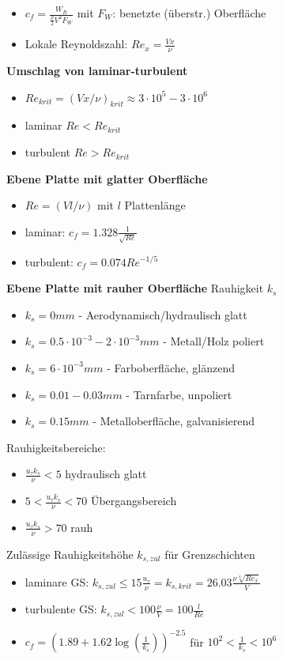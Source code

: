 \documentclass[8pt, landscape, fleqn]{scrartcl}
\begin{document}
\begin{multicols*}{3}
\begin{itemize}
    \item $c_f = \frac{W_R}{\frac{\rho}{2}V^2F_W}$ mit $F_W$: benetzte (überstr.) Oberfläche
    \item Lokale Reynoldszahl: $Re_x = \frac{V x}{\nu}$
\end{itemize}

\textbf{Umschlag von laminar-turbulent}

\begin{itemize}
    \item $Re_{krit} = (V x / \nu)_{krit} \approx 3\cdot 10^5-3\cdot 10^6$
    \item laminar $Re < Re_{krit}$
    \item turbulent $Re > Re_{krit}$
\end{itemize}

\textbf{Ebene Platte mit glatter Oberfläche}

\begin{itemize}
    \item $Re = (V l /\nu) $ mit $l$ Plattenlänge
    \item laminar: $c_f = 1.328 \frac{1}{\sqrt{Re}}$
    \item turbulent: $c_f = 0.074 Re^{-1/5}$
\end{itemize}

\textbf{Ebene Platte mit rauher Oberfläche}
\newline Rauhigkeit $k_s$
\begin{itemize}
    \item $k_s = 0 mm$ - Aerodynamisch/hydraulisch glatt
    \item $k_s = 0.5\cdot10^{-3} - 2 \cdot 10^{-3} mm $ - Metall/Holz poliert 
    \item $k_s = 6\cdot 10^{-3} mm$ - Farboberfläche, glänzend
    \item $k_s = 0.01-0.03 mm$ - Tarnfarbe, unpoliert
    \item $k_s = 0.15 mm$ - Metalloberfläche, galvanisierend
\end{itemize}
Rauhigkeitsbereiche:
\begin{itemize}
    \item $\frac{u_\tau k_s}{\nu} < 5$ hydraulisch glatt
    \item $5 <\frac{u_\tau k_s}{\nu} < 70$ Übergangsbereich
    \item $\frac{u_\tau k_s}{\nu} > 70$ rauh 
\end{itemize}
Zulässige Rauhigkeitshöhe $k_{s,zul}$ für Grenzschichten
\begin{itemize}
    \item laminare GS: $k_{s,zul} \leq 15 \frac{u_\tau}{\nu} = k_{s,krit} = 26.03 \frac{\nu \sqrt[4]{Re_x}}{V}$
    \item turbulente GS: $k_{s,zul} < 100 \frac{\nu}{V} = 100 \frac{l}{Re}$
    \item $c_f = (1.89 + 1.62 \log(\frac{1}{k_s}))^{-2.5}$ für $10^2 < \frac{1}{k_s} < 10^6$
\end{itemize}


\end{multicols*}
\end{document}
